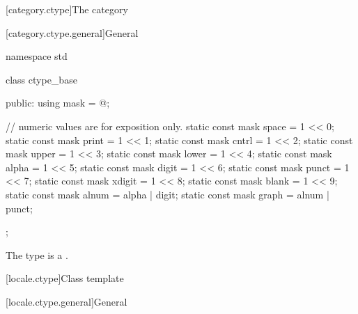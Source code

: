 [category.ctype]{The  category}

[category.ctype.general]{General}

%
\begin{codeblock}
namespace std {
  class ctype_base {
  public:
    using mask = @\seebelow@;

    // numeric values are for exposition only.
    static const mask space  = 1 << 0;
    static const mask print  = 1 << 1;
    static const mask cntrl  = 1 << 2;
    static const mask upper  = 1 << 3;
    static const mask lower  = 1 << 4;
    static const mask alpha  = 1 << 5;
    static const mask digit  = 1 << 6;
    static const mask punct  = 1 << 7;
    static const mask xdigit = 1 << 8;
    static const mask blank  = 1 << 9;
    static const mask alnum  = alpha | digit;
    static const mask graph  = alnum | punct;
  };
}
\end{codeblock}

\pnum
The type  is a .

[locale.ctype]{Class template }

[locale.ctype.general]{General}

